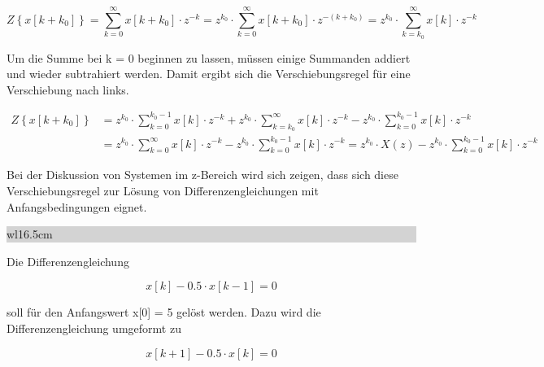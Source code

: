 \begin{equation}\label{eq:fivefourtyfour}
Z\left\{x[k+k_{0} ]\right\}=\sum _{k=0}^{\infty }x[k+k_{0} ]\cdot z^{-k}  =z^{k_{0} } \cdot \sum _{k=0}^{\infty }x[k+k_{0} ]\cdot z^{-(k+k_{0} )}  =z^{k_{0} } \cdot \sum _{k=k_{0} }^{\infty }x[k]\cdot z^{-k}  
\end{equation}

\noindent Um die Summe bei k = 0 beginnen zu lassen, m\"{u}ssen einige Summanden addiert und wieder subtrahiert werden. Damit ergibt sich die Verschiebungsregel f\"{u}r eine Verschiebung nach links.

\begin{equation}\label{eq:fivefourtyfive}
\begin{split}
Z\left\{x\left[k+k_{0} \right]\right\} & = z^{k_{0} } \cdot \sum _{k=0}^{k_{0} -1}x\left[k\right]\cdot z^{-k}  +z^{k_{0} } \cdot \sum _{k=k_{0} }^{\infty }x\left[k\right]\cdot z^{-k}  -z^{k_{0} } \cdot \sum _{k=0}^{k_{0} -1}x\left[k\right]\cdot z^{-k} \\
& = z^{k_{0}} \cdot \sum _{k=0}^{\infty}x\left[k\right]\cdot z^{-k} - z^{k_{0}} \cdot \sum _{k=0}^{k_{0} -1}x\left[k\right]\cdot z^{-k} = z^{k_{0}}\cdot X(z) - z^{k_{0}}\cdot\sum _{k=0}^{k_{0} -1} x[k] \cdot z^{-k}
\end{split}
\end{equation}

\noindent Bei der Diskussion von Systemen im z-Bereich wird sich zeigen, dass sich diese Verschiebungsregel zur L\"{o}sung von Differenzengleichungen mit Anfangsbedingungen eignet. \bigskip

\noindent
\colorbox{lightgray}{%
%
\renewcommand\arraystretch{0.6}%
\begin{tabular}{ wl{16.5cm} }
{\selectfont{Beispiel: Verschiebung nach links}}
\end{tabular}%
}\medskip

\noindent Die Differenzengleichung 

\begin{equation}\label{eq:fivefourtysix}
x\left[k\right]-0.5\cdot x\left[k-1\right]=0 
\end{equation}

\noindent soll f\"{u}r den Anfangswert x[0] = 5 gel\"{o}st werden. Dazu wird die Differenzengleichung umgeformt zu

\begin{equation}\label{eq:fivefourtyseven}
x\left[k+1\right]-0.5\cdot x\left[k\right]=0
\end{equation}

